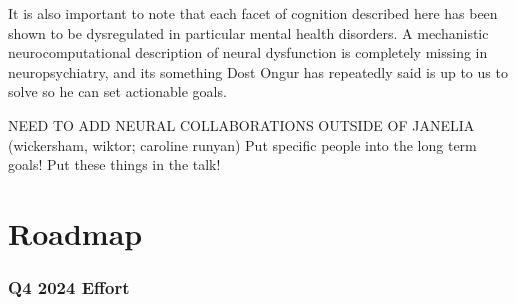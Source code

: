 \documentclass[
  letterpaper,
  DIV=11,
  numbers=noendperiod]{scrartcl}
\begin{document}
It is also important to note that each facet of cognition described here
has been shown to be dysregulated in particular mental health disorders.
A mechanistic neurocomputational description of neural dysfunction is
completely missing in neuropsychiatry, and its something Dost Ongur has
repeatedly said is up to us to solve so he can set actionable goals.

NEED TO ADD NEURAL COLLABORATIONS OUTSIDE OF JANELIA (wickersham,
wiktor; caroline runyan) Put specific people into the long term goals!
Put these things in the talk!

\section{Roadmap}\label{roadmap}

\subsubsection{Q4 2024 Effort}\label{q4-2024-effort}
\end{document}
